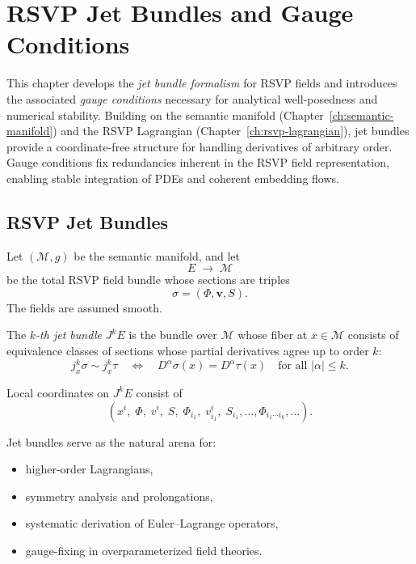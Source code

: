 \chapter{RSVP Jet Bundles and Gauge Conditions}
\label{ch:jet-bundles}

This chapter develops the \emph{jet bundle formalism} for RSVP fields and introduces the associated \emph{gauge conditions} necessary for analytical well-posedness and numerical stability. Building on the semantic manifold (Chapter~\ref{ch:semantic-manifold}) and the RSVP Lagrangian (Chapter~\ref{ch:rsvp-lagrangian}), jet bundles provide a coordinate-free structure for handling derivatives of arbitrary order. Gauge conditions fix redundancies inherent in the RSVP field representation, enabling stable integration of PDEs and coherent embedding flows.

\section{RSVP Jet Bundles}

Let $(\mathcal{M},g)$ be the semantic manifold, and let
\[
E \;\to\; \mathcal{M}
\]
be the total RSVP field bundle whose sections are triples
\[
\sigma = (\Phi,\mathbf{v},S).
\]
The fields are assumed smooth.

\begin{definition}
The \emph{$k$-th jet bundle} $J^k E$ is the bundle over $\mathcal{M}$ whose fiber at $x \in \mathcal{M}$ consists of equivalence classes of sections whose partial derivatives agree up to order $k$:
\[
j_x^k\sigma \sim j_x^k\tau
\quad\Longleftrightarrow\quad
D^\alpha \sigma(x) = D^\alpha \tau(x)
\quad\text{for all }|\alpha|\le k.
\]
\end{definition}

Local coordinates on $J^k E$ consist of
\[
(x^i,\;\Phi,\;v^i,\;S,\;\Phi_{i_1},\;v^i_{i_1},\;S_{i_1},\dots,\Phi_{i_1\cdots i_k},\dots).
\]

Jet bundles serve as the natural arena for:
\begin{itemize}
\item higher-order Lagrangians,
\item symmetry analysis and prolongations,
\item systematic derivation of Euler–Lagrange operators,
\item gauge-fixing in overparameterized field theories.
\end{itemize}

